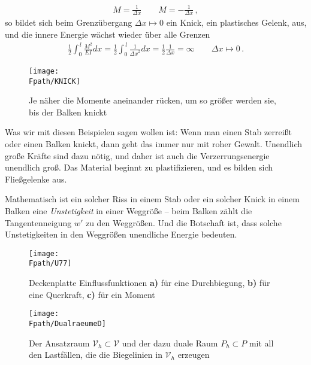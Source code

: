 {\begin{align}
M = \frac{1}{\Delta x} \qquad  M  = - \frac{1}{\Delta x}\,,
\end{align}
so bildet sich beim Grenz\"{u}bergang $\Delta x \mapsto 0$ ein Knick, ein plastisches
Gelenk, aus, und die innere Energie w\"{a}chst wieder \"{u}ber alle Grenzen
\begin{align}
 \frac{1}{2}\int_0^{\,l}
\frac{M^2}{EI} dx = \frac{1}{2}\int_0^{\,l} \frac{1}{{\Delta x}^2} dx =
\frac{1}{2}\frac{1}{\Delta x} = \infty \qquad  \Delta x \mapsto 0\,.
\end{align}
\begin{figure}[tbp] \centering
\if {} \sidecaption \fi
\texttt{[image: \\Fpath/KNICK]}
\caption{Je n\"{a}her die Momente aneinander r\"{u}cken, um so gr\"{o}{\ss}er werden sie, bis der Balken
knickt} \label{RissM}
\end{figure}%
Was wir mit diesen Beispielen sagen wollen ist: Wenn man einen Stab zerrei{\ss}t oder einen
Balken knickt, dann geht das immer nur mit roher Gewalt. Unendlich gro{\ss}e Kr\"{a}fte sind
dazu n\"{o}tig, und daher ist auch die Verzerrungsenergie unendlich gro{\ss}. Das Material
beginnt zu plastifizieren, und es bilden sich Flie{\ss}gelenke aus.

Mathematisch ist ein solcher Riss in einem Stab oder ein solcher Knick in einem Balken
eine {\em Unstetigkeit\/} in einer Weggr\"{o}{\ss}e -- beim Balken z\"{a}hlt die Tangentenneigung
$w{'}$ zu den Weggr\"{o}{\ss}en. Und die Botschaft ist, dass solche Unstetigkeiten in den
Weggr\"{o}{\ss}en unendliche Energie bedeuten.


\begin{figure}[tbp]
\centering
\texttt{[image: \\Fpath/U77]}
\caption{Deckenplatte Einflussfunktionen \textbf{ a)} f\"{u}r eine Durchbiegung, \textbf{ b)} f\"{u}r eine Querkraft, \textbf{ c)} f\"{u}r ein Moment}
\label{U77}%
\end{figure}%


\begin{figure}[tbp] \centering
\if {} \sidecaption \fi
\texttt{[image: \\Fpath/DualraeumeD]}
\caption{Der Ansatzraum $\mathcal{V}_{h} \subset \mathcal{V}$ und der dazu duale Raum $P_{h}  \subset P$ mit
all den Lastf\"{a}llen, die die Biegelinien in $\mathcal{V}_{h}$ erzeugen} \label{Dualraeume}
\end{figure}%

}

